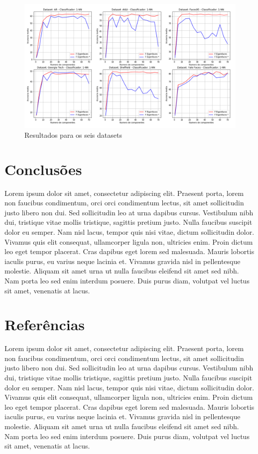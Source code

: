 \documentclass[12pt]{article}
\begin{document}
\begin{figure}[!h] \centering 
\includegraphics[scale=0.5]{resultados.png}
\caption{Resultados para os seis datasets} 
\label{fig:Res} \end{figure} 

\section{Conclusões}

Lorem ipsum dolor sit amet, consectetur adipiscing elit. Praesent porta, lorem non faucibus condimentum, orci orci condimentum lectus, sit amet sollicitudin justo libero non dui. Sed sollicitudin leo at urna dapibus cursus. Vestibulum nibh dui, tristique vitae mollis tristique, sagittis pretium justo. Nulla faucibus suscipit dolor eu semper. Nam nisl lacus, tempor quis nisi vitae, dictum sollicitudin dolor. Vivamus quis elit consequat, ullamcorper ligula non, ultricies enim. Proin dictum leo eget tempor placerat. Cras dapibus eget lorem sed malesuada. Mauris lobortis iaculis purus, eu varius neque lacinia et. Vivamus gravida nisl in pellentesque molestie. Aliquam sit amet urna ut nulla faucibus eleifend sit amet sed nibh. Nam porta leo sed enim interdum posuere. Duis purus diam, volutpat vel luctus sit amet, venenatis at lacus. 

\section{Referências}

Lorem ipsum dolor sit amet, consectetur adipiscing elit. Praesent porta, lorem non faucibus condimentum, orci orci condimentum lectus, sit amet sollicitudin justo libero non dui. Sed sollicitudin leo at urna dapibus cursus. Vestibulum nibh dui, tristique vitae mollis tristique, sagittis pretium justo. Nulla faucibus suscipit dolor eu semper. Nam nisl lacus, tempor quis nisi vitae, dictum sollicitudin dolor. Vivamus quis elit consequat, ullamcorper ligula non, ultricies enim. Proin dictum leo eget tempor placerat. Cras dapibus eget lorem sed malesuada. Mauris lobortis iaculis purus, eu varius neque lacinia et. Vivamus gravida nisl in pellentesque molestie. Aliquam sit amet urna ut nulla faucibus eleifend sit amet sed nibh. Nam porta leo sed enim interdum posuere. Duis purus diam, volutpat vel luctus sit amet, venenatis at lacus. 
\end{document}
